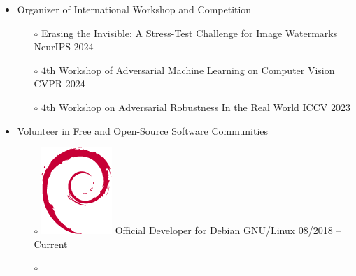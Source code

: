\documentclass[10pt,margin,line,pifont,palatino,courier]{res}
\begin{document}
\begin{resume}
\begin{itemize}[leftmargin=*]
\begin{itemize}[noitemsep, leftmargin=*]
    \end{itemize}
\item Organizer of International Workshop and Competition
    \begin{itemize}[noitemsep, leftmargin=*]
        \item[$\circ$] Erasing the Invisible: A Stress-Test Challenge for Image Watermarks \hfill NeurIPS 2024
\reversemarginpar{}
        \item[$\circ$] $4$th Workshop of Adversarial Machine Learning on Computer Vision \hfill CVPR 2024
\reversemarginpar{}
        \item[$\circ$] $4$th Workshop on Adversarial Robustness In the Real World \hfill ICCV  2023
\reversemarginpar{}
    \end{itemize}
\item Volunteer in Free and Open-Source Software Communities
    \begin{itemize}[noitemsep, leftmargin=*]
        \item[$\circ$] \href{https://nm.debian.org/person/lumin/}{
            \includegraphics[height=1.2\fontcharht\font`\B]{openlogo-nd-100.png}
            Official Developer} for Debian GNU/Linux
            \hfill 08/2018 -- Current
        \item[$\circ$] \href{https://wiki.gentoo.org/wiki/Blas-lapack-switch}{
}
\end{itemize}
\end{itemize}
\end{resume}
\end{document}
